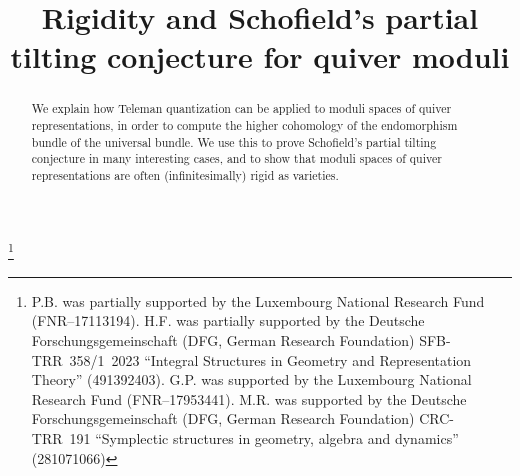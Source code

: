 \documentclass[JEP,XML,SOM,Unicode,NoEqCountersInSection,published]{cedram}
\theoremstyle{plain}
\theoremstyle{definition}
\begin{document}
\frontmatter

\title[Rigidity and Schofield's partial tilting conjecture for quiver moduli]{\hbox{Rigidity} and Schofield's partial tilting conjecture for quiver moduli}

\author[\initial{P.} \lastname{Belmans}]{ }
\address{Mathematical Institute, Utrecht University,\\
Budapestlaan 6, 3584 CD Utrecht, The Netherlands}

\author[\initial{A.-M.} \lastname{Brecan}]{ }
\urladdr{}

\author[\initial{H.} \lastname{Franzen}]{ }
\address{Institute of Mathematics, Paderborn University,\\
Warburger Str.\ 100, 33098 Paderborn, Germany}

\author[\initial{G.} \lastname{Petrella}]{ }
\address{Department of Mathematics, Université de Luxembourg,\\
2 Av.\ de l'Université, 4365, Esch-sur-Alzette, Luxembourg}

\author[\initial{M.} \lastname{Reineke}]{ }
\address{Fakultat für Mathematik, Ruhr-Universität Bochum,\\ Universitätsstr.\ 150, 44780 Bochum, Germany}

\thanks{P.B. was partially supported by the Luxembourg National Research Fund (FNR--17113194).
H.F. was partially supported by the Deutsche Forschungsgemeinschaft (DFG, German Research Foundation) SFB-TRR~358/1~2023 ``Integral Structures in Geometry and Representation Theory'' (491392403).
G.P. was supported by the Luxembourg National Research Fund (FNR--17953441).
M.R. was supported by the Deutsche Forschungsgemeinschaft (DFG, German Research Foundation) CRC-TRR~191 ``Symplectic structures in geometry, algebra and dynamics'' (281071066)}

\begin{abstract}
We explain how Teleman quantization can be applied to moduli spaces of quiver representations, in order to compute the higher cohomology of the endomorphism bundle of the universal bundle. We use this to prove Schofield's partial tilting conjecture in many interesting cases, and to show that moduli spaces of quiver representations are often (infinitesimally) rigid as varieties.
\end{abstract}
\end{document}
